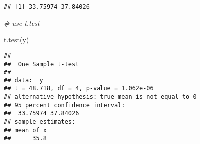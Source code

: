 \documentclass[
]{article}
\newenvironment{Shaded}{\begin{snugshade}}{\end{snugshade}}
\newcommand{\CommentTok}[1]{\textcolor[rgb]{0.56,0.35,0.01}{\textit{#1}}}
\newcommand{\FunctionTok}[1]{\textcolor[rgb]{0.00,0.00,0.00}{#1}}
\newcommand{\NormalTok}[1]{#1}
\begin{document}
\begin{verbatim}
## [1] 33.75974 37.84026
\end{verbatim}

\begin{Shaded}
\begin{Highlighting}[]
\CommentTok{\# use t.test}

\FunctionTok{t.test}\NormalTok{(y)}
\end{Highlighting}
\end{Shaded}

\begin{verbatim}
## 
##  One Sample t-test
## 
## data:  y
## t = 48.718, df = 4, p-value = 1.062e-06
## alternative hypothesis: true mean is not equal to 0
## 95 percent confidence interval:
##  33.75974 37.84026
## sample estimates:
## mean of x 
##      35.8
\end{verbatim}
\end{document}
